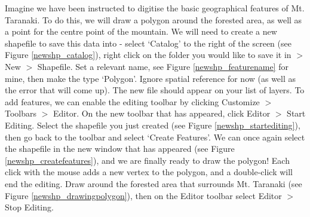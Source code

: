 \documentclass{article}
\begin{document}
Imagine we have been instructed to digitise the basic geographical features of Mt. Taranaki. To do this, we will draw a polygon around the forested area, as well as a point for the centre point of the mountain. We will need to create a new shapefile to save this data into - select `Catalog' to the right of the screen (see Figure \ref{newshp_catalog}), right click on the folder you would like to save it in $>$ New $>$ Shapefile. Set a relevant name, see Figure \ref{newshp_featurename} for mine, then make the type `Polygon'. Ignore spatial reference for now (as well as the error that will come up). The new file should appear on your list of layers. To add features, we can enable the editing toolbar by clicking Customize $>$ Toolbars $>$ Editor. On the new toolbar that has appeared, click Editor $>$ Start Editing. Select the shapefile you just created (see Figure \ref{newshp_startediting}), then go back to the toolbar and select `Create Features'. We can once again select the shapefile in the new window that has appeared (see Figure \ref{newshp_createfeatures}), and we are finally ready to draw the polygon! Each click with the mouse adds a new vertex to the polygon, and a double-click will end the editing. Draw around the forested area that surrounds Mt. Taranaki (see Figure \ref{newshp_drawingpolygon}), then on the Editor toolbar select Editor $>$ Stop Editing.\\
\end{document}
